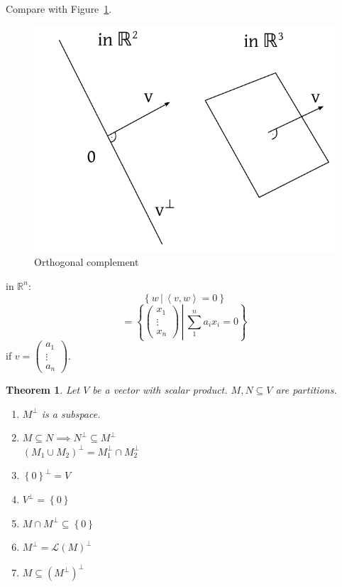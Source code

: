 \documentclass{article}
\newcounter{lecref}[section]
\numberwithin{lecref}{section}
\newtheorem{theorem}[lecref]{Theorem}
\newcommand{\set}[1]{\left\{#1\right\}}
\newcommand{\setdef}[2]{\left\{\left.#1\,\right|\,#2\right\}}
\newcommand{\ip}[2]{\left\langle#1,#2\right\rangle} %
\begin{document}
Compare with Figure~\ref{orthocomp}.
\begin{figure}[!ht]
  \begin{center}
    \includegraphics{img/07_orthogonal_complement.pdf}
    \caption{Orthogonal complement}
    \label{orthocomp}
  \end{center}
\end{figure}

in $\mathbb R^n$:
\[ \setdef{w}{\ip vw = 0} \]
\[ = \setdef{\begin{pmatrix} x_1 \\ \vdots \\ x_n \end{pmatrix}}{\sum_{1}^n a_i x_i = 0} \]
if $v = \begin{pmatrix} a_1 \\ \vdots \\ a_n \end{pmatrix}$.

\begin{theorem} %
  \label{thm841}
  Let $V$ be a vector with scalar product. $M, N \subseteq V$ are partitions.
  \begin{enumerate}
    \item $M^\bot$ is a subspace.
    \item $M \subseteq N \implies N^\bot \subseteq M^\bot$ \\
      $(M_1 \cup M_2)^\bot = M_1^\bot \cap M_2^\bot$
    \item $\set{0}^\bot = V$
    \item $V^\bot = \set{0}$
    \item $M \cap M^\bot \subseteq \set{0}$
    \item $M^\bot = \mathcal L(M)^\bot$
    \item $M \subseteq (M^\bot)^\bot$
  \end{enumerate}
\end{theorem}
\end{document}
